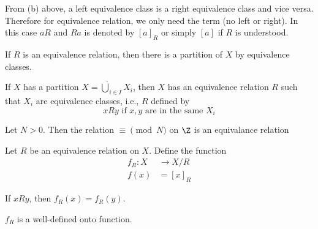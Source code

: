 From (b) above,
a left equivalence class is a right equivalence class
and vice versa. 
Therefore for equivalence relation, we only need the term
 (no left or right).
In this case $aR$ and $Ra$ is denoted by
$[a]_R$
or simply
$[a]$ if $R$ is understood.

\begin{prop}
  \mbox{}
  \begin{myenum}
  \item
    If $R$ is an equivalence relation, then there is a partition
    of $X$ by equivalence classes.
  \item
    If $X$ has a partition $X = \dot{\bigcup}_{i \in I} X_i$, then
    $X$ has an equivalence relation $R$ such that
    $X_i$ are equivalence classes, i.e., $R$ defined by
    \[
    x R y \text{ if $x,y$ are in the same $X_i$}
    \]
  \end{myenum}
\end{prop}

\begin{prop}
  Let $N > 0$.
  Then the relation $\equiv \pmod{N}$ on $\Z$ is an equivalance relation
\end{prop}


Let $R$ be an equivalence relation on $X$.
Define the function
\begin{align*}
  f_R: X &\rightarrow X/R \\
  f(x) &= [x]_R
\end{align*}

\begin{prop}
  \mbox{}
  \begin{myenum}
  \item
    If $x R y$, then $f_R(x) = f_R(y)$.
 \item
    $f_R$ is a well-defined onto function.
  \end{myenum}
\end{prop}

